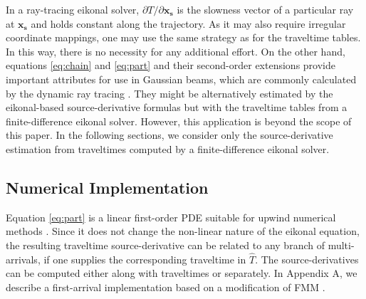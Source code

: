 In a ray-tracing eikonal solver, $\partial T / \partial \mathbf{x_s}$ is the slowness vector 
of a particular ray at $\mathbf{x_s}$ and holds constant along the trajectory. As it may also require 
irregular coordinate mappings, one may use the same strategy as for the traveltime tables. In this way, 
there is no necessity for any additional effort. On the other hand, equations \ref{eq:chain} and 
\ref{eq:part} and their second-order extensions provide important attributes for use in Gaussian beams, 
which are commonly calculated by the dynamic ray tracing \cite[]{cerveny}. They might be alternatively 
estimated by the eikonal-based source-derivative formulas but with the traveltime tables from a 
finite-difference eikonal solver. However, this application is beyond the scope of this paper. In the 
following sections, we consider only the source-derivative estimation from traveltimes computed by a 
finite-difference eikonal solver.

\subsection{Numerical Implementation}

Equation \ref{eq:part} is a linear first-order PDE suitable for upwind numerical methods 
\cite[]{franklin}. Since it does not change the non-linear nature of the eikonal equation, 
the resulting traveltime source-derivative can be related to any branch of multi-arrivals, 
if one supplies the corresponding traveltime in $\hat{T}$. The source-derivatives can be 
computed either along with traveltimes or separately. In Appendix A, we describe a first-arrival 
implementation based on a modification of FMM \cite[]{sethian1}.

